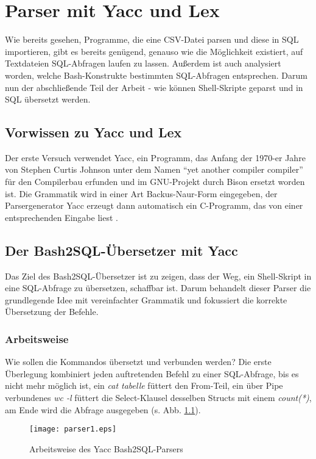 \chapter{Parser mit Yacc und Lex}
Wie bereits gesehen, Programme, die eine CSV-Datei parsen und diese in SQL importieren, gibt es bereits genügend, genauso wie die Möglichkeit existiert, auf Textdateien SQL-Abfragen laufen zu lassen. Außerdem ist auch analysiert worden, welche Bash-Konstrukte bestimmten SQL-Abfragen entsprechen. Darum nun der abschließende Teil der Arbeit - wie können Shell-Skripte geparst und in SQL übersetzt werden.

\section{Vorwissen zu Yacc und Lex}
Der erste Versuch verwendet Yacc, ein Programm, das Anfang der 1970-er Jahre von Stephen Curtis Johnson unter dem Namen "`yet another compiler compiler"' für den Compilerbau erfunden und im GNU-Projekt durch Bison ersetzt worden ist. Die Grammatik wird in einer Art Backus-Naur-Form eingegeben, der Parsergenerator Yacc erzeugt dann automatisch ein C-Programm, das von einer entsprechenden Eingabe liest \cite{meinders}.

\section{Der Bash2SQL-Übersetzer mit Yacc}
Das Ziel des Bash2SQL-Übersetzer ist zu zeigen, dass der Weg, ein Shell-Skript in eine SQL-Abfrage zu übersetzen, schaffbar ist. Darum behandelt dieser Parser die grundlegende Idee mit vereinfachter Grammatik und fokussiert die korrekte Übersetzung der Befehle.

\subsection{Arbeitsweise}
Wie sollen die Kommandos übersetzt und verbunden werden? Die erste Überlegung kombiniert jeden auftretenden Befehl zu einer SQL-Abfrage, bis es nicht mehr möglich ist,
ein \textit{cat tabelle} füttert den From-Teil, ein über Pipe verbundenes \textit{wc -l} füttert die Select-Klausel desselben Structs mit einem \textit{count(*)}, am Ende wird die Abfrage ausgegeben (s. Abb. \ref{fig:parser1}).

\begin{figure}[h]
\centering
\texttt{[image: parser1.eps]}
\caption{Arbeitsweise des Yacc Bash2SQL-Parsers}
\label{fig:parser1}
\end{figure}

